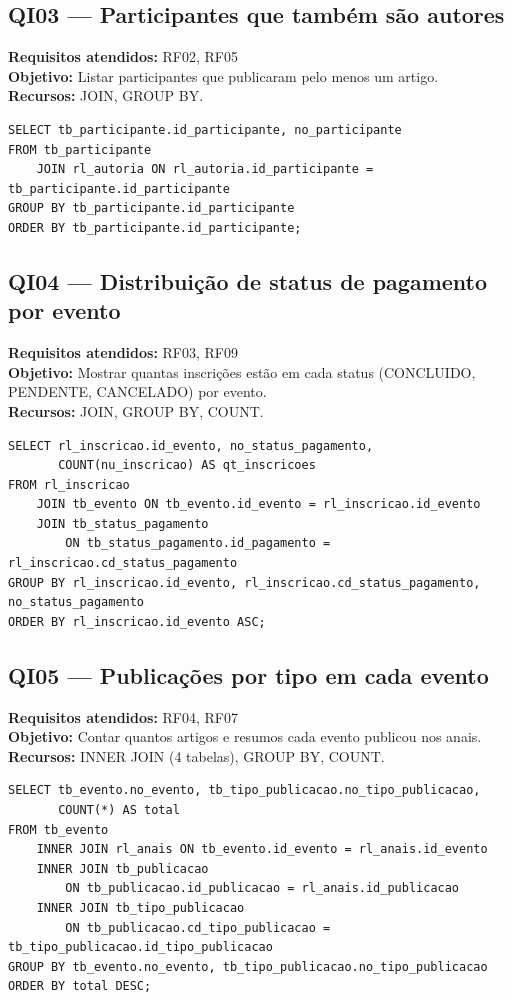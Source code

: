 \documentclass[12pt,a4paper]{article}
\begin{document}
\subsection{QI03 --- Participantes que também são autores}
\textbf{Requisitos atendidos:} RF02, RF05 \\
\textbf{Objetivo:} Listar participantes que publicaram pelo menos um artigo.\\
\textbf{Recursos:} JOIN, GROUP BY.
\begin{lstlisting}[caption={QI03 -- Participantes que também são autores.}]
SELECT tb_participante.id_participante, no_participante
FROM tb_participante
    JOIN rl_autoria ON rl_autoria.id_participante = tb_participante.id_participante
GROUP BY tb_participante.id_participante
ORDER BY tb_participante.id_participante;
\end{lstlisting}

\subsection{QI04 --- Distribuição de status de pagamento por evento}
\textbf{Requisitos atendidos:} RF03, RF09 \\
\textbf{Objetivo:} Mostrar quantas inscrições estão em cada status (CONCLUIDO, PENDENTE, CANCELADO) por evento.\\
\textbf{Recursos:} JOIN, GROUP BY, COUNT.
\begin{lstlisting}[caption={QI04 -- Status de pagamento por evento.}]
SELECT rl_inscricao.id_evento, no_status_pagamento,
       COUNT(nu_inscricao) AS qt_inscricoes
FROM rl_inscricao
    JOIN tb_evento ON tb_evento.id_evento = rl_inscricao.id_evento
    JOIN tb_status_pagamento
        ON tb_status_pagamento.id_pagamento = rl_inscricao.cd_status_pagamento
GROUP BY rl_inscricao.id_evento, rl_inscricao.cd_status_pagamento, no_status_pagamento
ORDER BY rl_inscricao.id_evento ASC;
\end{lstlisting}

\subsection{QI05 --- Publicações por tipo em cada evento}
\textbf{Requisitos atendidos:} RF04, RF07 \\
\textbf{Objetivo:} Contar quantos artigos e resumos cada evento publicou nos anais.\\
\textbf{Recursos:} INNER JOIN (4 tabelas), GROUP BY, COUNT.
\begin{lstlisting}[caption={QI05 -- Publicações por tipo em cada evento.}]
SELECT tb_evento.no_evento, tb_tipo_publicacao.no_tipo_publicacao,
       COUNT(*) AS total
FROM tb_evento
    INNER JOIN rl_anais ON tb_evento.id_evento = rl_anais.id_evento
    INNER JOIN tb_publicacao
        ON tb_publicacao.id_publicacao = rl_anais.id_publicacao
    INNER JOIN tb_tipo_publicacao
        ON tb_publicacao.cd_tipo_publicacao = tb_tipo_publicacao.id_tipo_publicacao
GROUP BY tb_evento.no_evento, tb_tipo_publicacao.no_tipo_publicacao
ORDER BY total DESC;
\end{lstlisting}
\end{document}
